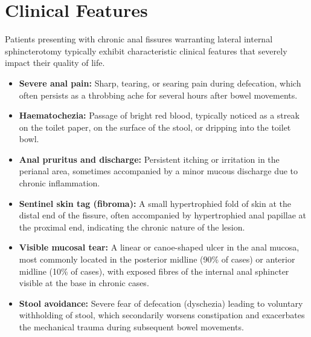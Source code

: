 \section*{Clinical Features}
Patients presenting with chronic anal fissures warranting lateral internal sphincterotomy typically exhibit characteristic clinical features that severely impact their quality of life.
\begin{itemize}
    \item \textbf{Severe anal pain:} Sharp, tearing, or searing pain during defecation, which often persists as a throbbing ache for several hours after bowel movements.
    \item \textbf{Haematochezia:} Passage of bright red blood, typically noticed as a streak on the toilet paper, on the surface of the stool, or dripping into the toilet bowl.
    \item \textbf{Anal pruritus and discharge:} Persistent itching or irritation in the perianal area, sometimes accompanied by a minor mucous discharge due to chronic inflammation.
    \item \textbf{Sentinel skin tag (fibroma):} A small hypertrophied fold of skin at the distal end of the fissure, often accompanied by hypertrophied anal papillae at the proximal end, indicating the chronic nature of the lesion.
    \item \textbf{Visible mucosal tear:} A linear or canoe-shaped ulcer in the anal mucosa, most commonly located in the posterior midline (90\% of cases) or anterior midline (10\% of cases), with exposed fibres of the internal anal sphincter visible at the base in chronic cases.
    \item \textbf{Stool avoidance:} Severe fear of defecation (dyschezia) leading to voluntary withholding of stool, which secondarily worsens constipation and exacerbates the mechanical trauma during subsequent bowel movements.
\end{itemize}

